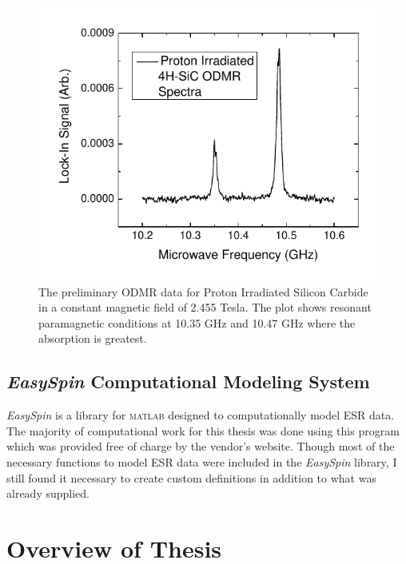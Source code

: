 \documentclass[oneside, astronomy, noacknowlegments]{BYUPhys}
\begin{document}
\begin{figure}
    \centerline{\includegraphics{p14-odmr}}
    \caption[Preliminary ODMR data]{\label{fig:PrelimODMR}
     The preliminary ODMR data for Proton Irradiated Silicon Carbide in a constant magnetic field of 2.455 Tesla. The plot shows resonant paramagnetic conditions at 10.35 GHz and 10.47 GHz where the absorption is greatest. }
\end{figure}

\subsection{\textit{EasySpin} Computational Modeling System}

\textit{EasySpin} is a library for \textsc{matlab} designed to computationally model ESR data. The majority of computational work for this thesis was done using this program which was provided free of charge by the vendor's website. Though most of the necessary functions to model ESR data were included in the \textit{EasySpin} library, I still found it necessary to create custom definitions in addition to what was already supplied.

\section{Overview of Thesis}
\end{document}
